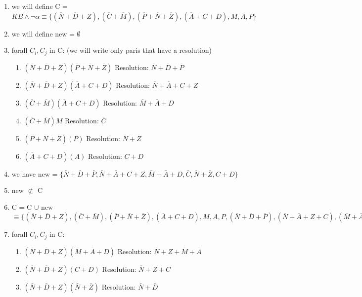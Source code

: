 \documentclass{article}
\begin{document}
\begin{enumerate}
    \item we will define C = $KB \land \neg \alpha \equiv \{(\overline N +\overline D + Z),(\overline C + \overline M),(\overline P + \overline N + \overline Z),(\overline A + C + D),M,A,P\}$
    \item we will define new = $\emptyset$
    \item forall $C_i, C_j$ in C: (we will write only paris that have a resolution)
    \begin{enumerate}
        \item $(\overline N +\overline D + Z)(\overline P + \overline N + \overline Z)$ Resolution: $\overline N + \overline D + \overline P $
        \item $(\overline N +\overline D + Z)(\overline A + C +D)$ Resolution: $\overline N + \overline A + C + Z$
        \item $(\overline C + \overline M)(\overline A + C + D)$ Resolution: $\overline M + \overline A +D$
        \item $(\overline C + \overline M)M$ Resolution: $ \overline C$
        \item $(\overline P + \overline N + \overline Z)(P)$ Resolution: $\overline N + \overline Z$
        \item $(\overline A + C +D)(A)$ Resolution: $C + D$
    \end{enumerate}
    \item we have new = $\{\overline N + \overline D + \overline P , \overline N + \overline A + C + Z,  \overline M + \overline A + D, \overline C, \overline N + \overline Z, C + D\}$
    \item new $\not\subset$ C
    \item C = C $\cup$ new $\equiv \{(\overline N +\overline D + Z),(\overline C + \overline M),(\overline P + \overline N + \overline Z),(\overline A + C + D),M,A,P,(\overline N + \overline D + \overline P), (\overline N + \overline A + Z + C), (\overline M + \overline A + D), \overline C, (\overline N + \overline Z), (C + D)\}$
    \item forall $C_i, C_j$ in C:
    \begin{enumerate}
        \item $(\overline N + \overline D + Z )(\overline M + \overline A + D)$ Resolution: $\overline N + Z + \overline M + \overline A$
        \item $(\overline N + \overline D + Z )(C+D)$ Resolution: $\overline N + Z + C $
        \item $(\overline N + \overline D + Z )(\overline N + \overline Z)$ Resolution: $\overline N + \overline D$

\end{enumerate}
\end{enumerate}
\end{document}
